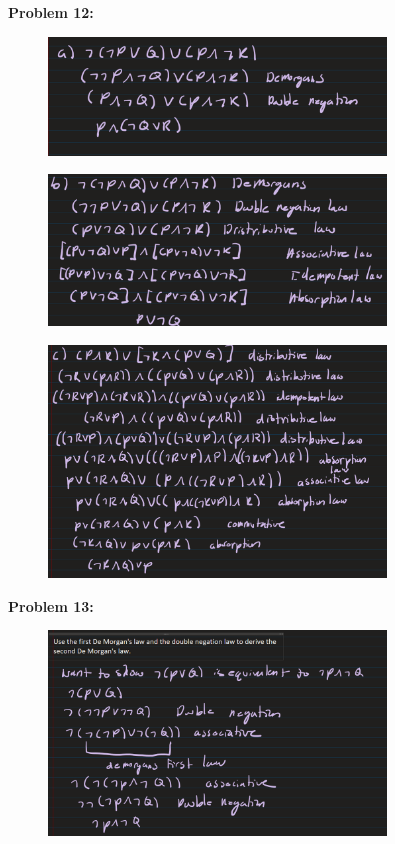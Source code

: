 \textbf{Problem 12:}
\begin{figure}[H]
    \centering
    \includegraphics[width=0.8\textwidth]{images/1.2/6.PNG}
\end{figure}
\begin{figure}[H]
    \centering
    \includegraphics[width=0.8\textwidth]{images/1.2/7.PNG}
\end{figure}
\begin{figure}[H]
    \centering
    \includegraphics[width=0.8\textwidth]{images/1.2/8.PNG}
\end{figure}

\textbf{Problem 13:}
\begin{figure}[H]
    \centering
    \includegraphics[width=0.8\textwidth]{images/1.2/9.PNG}
\end{figure}

